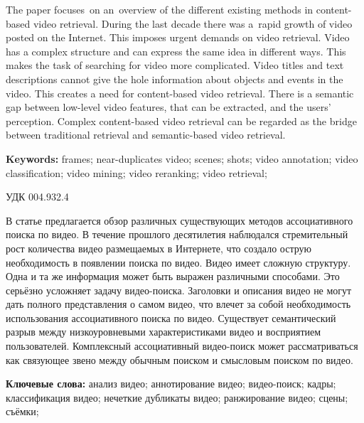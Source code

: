 


The paper focuses on an overview of the different existing methods
in content-based video retrieval.
During the last decade there was a~rapid growth
of video posted on the Internet.
This imposes urgent demands on video retrieval.
Video has a complex structure and can express the same idea
in different ways. This makes the task of searching for video more complicated.
Video titles and text descriptions cannot give the hole information
about objects and events in the video.
This creates a need for content-based video retrieval.
There is a semantic gap between low-level video features,
that can be extracted, and the users' perception.
Complex content-based video retrieval
can be regarded as the bridge between traditional retrieval
and semantic-based video retrieval.


{\bf Keywords:}
frames;
near-duplicates video;
scenes;
shots;
video annotation;
video classification;
video mining;
video reranking;
video retrieval;

\pagebreak
УДК 004.932.4




В статье предлагается обзор различных существующих методов
ассоциативного поиска по видео.
В течение прошлого десятилетия наблюдался стремительный рост
количества видео размещаемых в Интернете,
что создало острую необходимость в появлении поиска по видео.
Видео имеет сложную структуру. Одна и та же информация
может быть выражен различными способами.
Это серьёзно усложняет задачу видео-поиска.
Заголовки и описания видео не могут
дать полного представления о самом видео,
что влечет за собой необходимость использования
ассоциативного поиска по видео.
Существует семантический разрыв между низкоуровневыми
характеристиками видео и восприятием пользователей.
Комплексный ассоциативный видео-поиск
может рассматриваться как связующее звено между обычным поиском
и смысловым поиском по видео.

{\bf Ключевые слова:}
анализ видео;
аннотирование видео;
видео-поиск;
кадры;
классификация видео;
нечеткие дубликаты видео;
ранжирование видео;
сцены;
съёмки;



%
%
%

